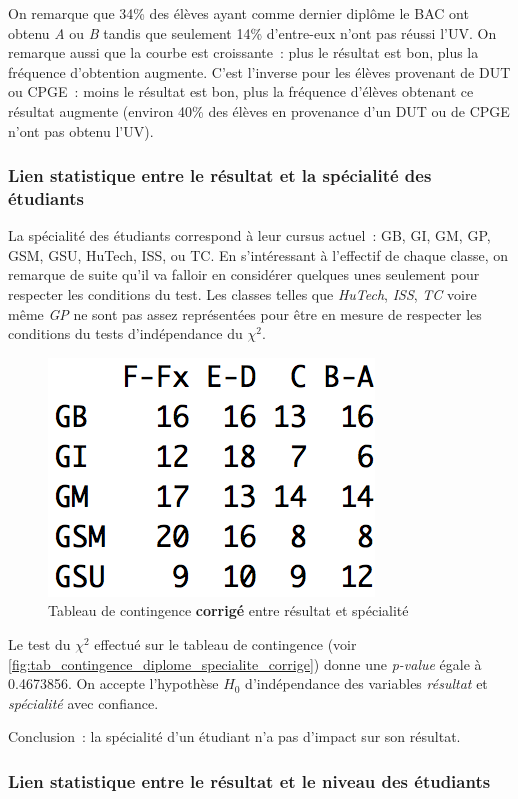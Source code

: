 \documentclass[a4paper,10pt]{report}
\begin{document}
On remarque que 34\% des élèves ayant comme dernier diplôme le BAC ont obtenu \textit{A} ou \textit{B} tandis que seulement 14\% d'entre-eux n'ont pas réussi l'UV. On remarque aussi que la courbe est croissante~: plus le résultat est bon, plus la fréquence d'obtention augmente. C'est l'inverse pour les élèves provenant de DUT ou CPGE~: moins le résultat est bon, plus la fréquence d'élèves obtenant ce résultat augmente (environ 40\% des élèves en provenance d'un DUT ou de CPGE n'ont pas obtenu l'UV).


\subsubsection{Lien statistique entre le résultat et la spécialité des étudiants}

La spécialité des étudiants correspond à leur cursus actuel~: GB, GI, GM, GP, GSM, GSU, HuTech, ISS, ou TC. En s'intéressant à l'effectif de chaque classe, on remarque de suite qu'il va falloir en considérer quelques unes seulement pour respecter les conditions du test. Les classes telles que \textit{HuTech}, \textit{ISS}, \textit{TC} voire même \textit{GP} ne sont pas assez représentées pour être en mesure de respecter les conditions du tests d'indépendance du $\chi^2$.

\begin{figure}[H]
	\centering
	\captionsetup{justification=centering, margin=1cm}
	\includegraphics[width=0.2\linewidth]{img/1-1-2-Contingence-Result-Specialite-Corrige}
	\caption{\scriptsize Tableau de contingence \textbf{corrigé} entre résultat et spécialité}
	\label{fig:tab_contingence_diplome_specialite_corrige}
\end{figure}

Le test du $\chi^2$ effectué sur le tableau de contingence (voir \autoref{fig:tab_contingence_diplome_specialite_corrige}) donne une \textit{p-value} égale à 0.4673856. On accepte l'hypothèse $H_{0}$ d'indépendance des variables \textit{résultat} et \textit{spécialité} avec confiance.

Conclusion~: la spécialité d'un étudiant n'a pas d'impact sur son résultat.


\subsubsection{Lien statistique entre le résultat et le niveau des étudiants}
\end{document}
